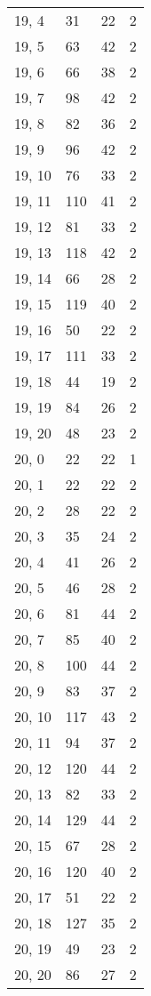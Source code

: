 \begin{table}
\begin{tabular}{llll}
19, 4  &   31 &   22 &     2 \\
19, 5  &   63 &   42 &     2 \\
19, 6  &   66 &   38 &     2 \\
19, 7  &   98 &   42 &     2 \\
19, 8  &   82 &   36 &     2 \\
19, 9  &   96 &   42 &     2 \\
19, 10 &   76 &   33 &     2 \\
19, 11 &  110 &   41 &     2 \\
19, 12 &   81 &   33 &     2 \\
19, 13 &  118 &   42 &     2 \\
19, 14 &   66 &   28 &     2 \\
19, 15 &  119 &   40 &     2 \\
19, 16 &   50 &   22 &     2 \\
19, 17 &  111 &   33 &     2 \\
19, 18 &   44 &   19 &     2 \\
19, 19 &   84 &   26 &     2 \\
19, 20 &   48 &   23 &     2 \\
20, 0  &   22 &   22 &     1 \\
20, 1  &   22 &   22 &     2 \\
20, 2  &   28 &   22 &     2 \\
20, 3  &   35 &   24 &     2 \\
20, 4  &   41 &   26 &     2 \\
20, 5  &   46 &   28 &     2 \\
20, 6  &   81 &   44 &     2 \\
20, 7  &   85 &   40 &     2 \\
20, 8  &  100 &   44 &     2 \\
20, 9  &   83 &   37 &     2 \\
20, 10 &  117 &   43 &     2 \\
20, 11 &   94 &   37 &     2 \\
20, 12 &  120 &   44 &     2 \\
20, 13 &   82 &   33 &     2 \\
20, 14 &  129 &   44 &     2 \\
20, 15 &   67 &   28 &     2 \\
20, 16 &  120 &   40 &     2 \\
20, 17 &   51 &   22 &     2 \\
20, 18 &  127 &   35 &     2 \\
20, 19 &   49 &   23 &     2 \\
20, 20 &   86 &   27 &     2 \\
\bottomrule
\end{tabular}
\end{table}
